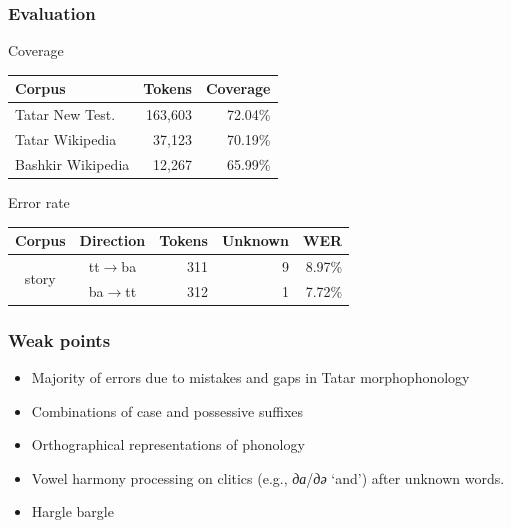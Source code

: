 \documentclass[10pt,xetex]{beamer} %
\begin{document}
\begin{frame}
  \frametitle{Evaluation}

\begin{block}{Coverage}

\begin{center}
  \begin{tabular}{lrr}
  \hline
   Corpus                  & Tokens    & Coverage\\
  \hline
   Tatar New Test.         & 163,603   & 72.04\% \\
   Tatar Wikipedia         & 37,123    & 70.19\% \\
  \hline
   Bashkir Wikipedia       & 12,267    & 65.99\% \\
  \hline
  \end{tabular}
\end{center}
\end{block}

\begin{block}{Error rate}
\begin{center}

  \begin{tabular}{ccrrr}
  \hline
   Corpus                 & Direction         & Tokens  & Unknown & WER  \\
  \hline
   \multirow{2}{*}{story} & tt$\rightarrow$ba & 311     & 9  & 8.97\% \\
                          & ba$\rightarrow$tt & 312     & 1  & 7.72\%  \\
  \hline
  \end{tabular}
\end{center}
\end{block}

\end{frame}

\begin{frame}
  \frametitle{Weak points}

\begin{itemize}
  \item Majority of errors due to mistakes and gaps in Tatar morphophonology
  \item Combinations of case and possessive suffixes
  \item Orthographical representations of phonology
  \item Vowel harmony processing on clitics (e.g., \emph{да}/\emph{дә} `and')  
     after unknown words.
  \item Hargle bargle
\end{itemize}

\end{frame}
\end{document}
